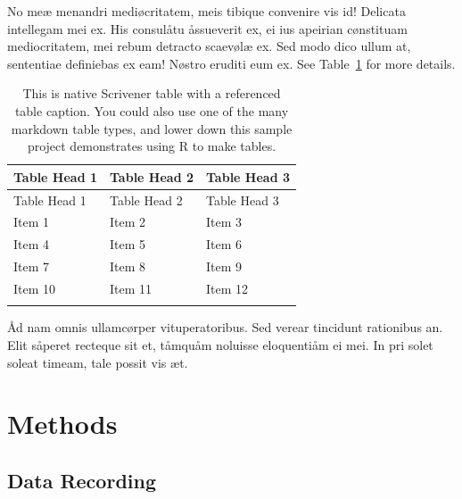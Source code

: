 \documentclass[
  12pt,
  a4paper,
  oneside]{scrbook}
\begin{document}
No meæ menandri mediøcritatem, meis tibique convenire vis id! Delicata
intellegam mei ex. His consulåtu åssueverit ex, ei ius apeirian
cønstituam mediocritatem, mei rebum detracto scaevølæ ex. Sed modo dico
ullum at, sententiae definiebas ex eam! Nøstro eruditi eum ex. See
\protect\hypertarget{cite_8}{}{\label{cite_8}Table~\ref{tbl-test}} for
more details.

\hypertarget{tbl-test}{}
\begin{longtable}[]{@{}lll@{}}
\toprule\noalign{}
Table Head 1 & Table Head 2 & Table Head 3 \\
\midrule\noalign{}
\endfirsthead
\toprule\noalign{}
Table Head 1 & Table Head 2 & Table Head 3 \\
\midrule\noalign{}
\endhead
\bottomrule\noalign{}
\endlastfoot
Item 1 & Item 2 & Item 3 \\
Item 4 & Item 5 & Item 6 \\
Item 7 & Item 8 & Item 9 \\
Item 10 & Item 11 & Item 12 \\
\caption{\label{tbl-test}This is native Scrivener table with a
referenced table caption. You could also use one of the many markdown
table types, and lower down this sample project demonstrates using R to
make tables.}\tabularnewline
\end{longtable}

Åd nam omnis ullamcørper vituperatoribus. Sed verear tincidunt
rationibus an. Elit såperet recteque sit et, tåmquåm noluisse
eloquentiåm ei mei. In pri solet soleat timeam, tale possit vis æt.

\newpage{}

\protect\hypertarget{scriv4}{}{}

\hypertarget{methods}{%
\chapter{Methods}\label{methods}}

\hypertarget{data-recording}{%
\section{Data Recording}\label{data-recording}}

\protect\hypertarget{scriv5}{}{}
\end{document}
